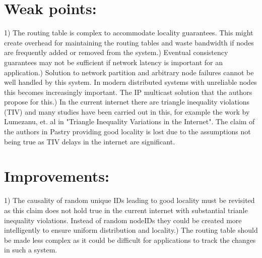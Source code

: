 \documentclass[12pt]{article}
\begin{document}
\section{Weak points:}
1) The routing table is complex to accommodate locality guarantees. This might create overhead for maintaining the routing tables and waste bandwidth if nodes are frequently added or removed from the system.) Eventual consistency guarantees may not be sufficient if network latency is important for an application.) Solution to network partition and arbitrary node failures cannot be well handled by this system. In modern distributed systems with unreliable nodes this becomes increasingly important. The IP multicast solution that the authors propose for this.) In the current internet there are triangle inequality violations (TIV) and many studies have been carried out in this, for example the work by Lumezanu, et. al in "Triangle Inequality Variations in the Internet". The claim of the authors in Pastry providing good locality is lost due to the assumptions not being true as TIV delays in the internet are significant.
\newline

\section{Improvements:}
1) The causality of random unique IDs leading to good locality must be revisited as this claim does not hold true in the current internet with substantial trianle inequality violations. Instead of random nodeIDs they could be created more intelligently to ensure uniform distribution and locality.) The routing table should be made less complex as it could be difficult for applications to track the changes in such a system.\newline
\end{document}
